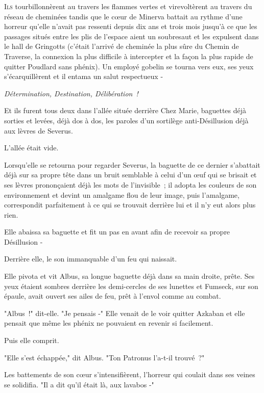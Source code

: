 
\lettrine{I}{ls} tourbillonnèrent au travers les flammes vertes et virevoltèrent au travers du réseau de cheminées tandis que le cœur de Minerva battait au rythme d'une horreur qu'elle n'avait pas ressenti depuis dix ans et trois mois jusqu'à ce que les passages situés entre les plis de l'espace aient un soubresaut et les expulsent dans le hall de Gringotts (c'était l'arrivé de cheminée la plus sûre du Chemin de Traverse, la connexion la plus difficile à intercepter et la façon la plus rapide de quitter Poudlard sans phénix). Un employé gobelin se tourna vers eux, ses yeux s'écarquillèrent et il entama un salut respectueux -

\emph{Détermination, Destination, Délibération~!}

Et ils furent tous deux dans l'allée située derrière Chez Marie, baguettes déjà sorties et levées, déjà dos à dos, les paroles d'un sortilège anti-Désillusion déjà aux lèvres de Severus.

L'allée était vide.

Lorsqu'elle se retourna pour regarder Severus, la baguette de ce dernier s'abattait déjà sur sa propre tête dans un bruit semblable à celui d'un œuf qui se brisait et ses lèvres prononçaient déjà les mots de l'invisible~; il adopta les couleurs de son environnement et devint un amalgame flou de leur image, puis l'amalgame, correspondit parfaitement à ce qui se trouvait derrière lui et il n'y eut alors plus rien.

Elle abaissa sa baguette et fit un pas en avant afin de recevoir sa propre Désillusion -

Derrière elle, le son immanquable d'un feu qui naissait.

Elle pivota et vit Albus, sa longue baguette déjà dans sa main droite, prête. Ses yeux étaient sombres derrière les demi-cercles de ses lunettes et Fumseck, sur son épaule, avait ouvert ses ailes de feu, prêt à l'envol comme au combat.

"Albus~!" dit-elle. "Je pensais -" Elle venait de le voir quitter Azkaban et elle pensait que même les phénix ne pouvaient en revenir si facilement.

Puis elle comprit.

"Elle s'est échappée," dit Albus. "Ton Patronus l'a-t-il trouvé~?"

Les battements de son cœur s'intensifièrent, l'horreur qui coulait dans ses veines se solidifia. "Il a dit qu'il était là, aux lavabos -"

